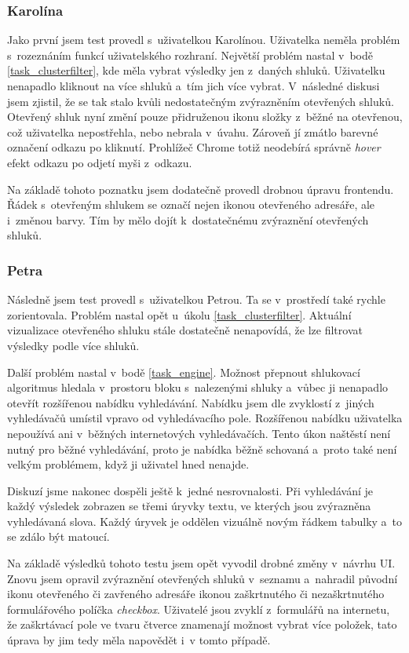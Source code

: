 \subsubsection{Karolína}
Jako první jsem test provedl s~uživatelkou Karolínou. Uživatelka neměla problém s~rozeznáním funkcí uživatelského rozhraní. Největší problém nastal v~bodě \ref{task_clusterfilter}, kde měla vybrat výsledky jen z~daných shluků. Uživatelku nenapadlo kliknout na více shluků a~tím jich více vybrat. V~následné diskusi jsem zjistil, že se tak stalo kvůli nedostatečným zvýrazněním otevřených shluků. Otevřený shluk nyní změní pouze přidruženou ikonu složky z~běžné na otevřenou, což uživatelka nepostřehla, nebo nebrala v~úvahu. Zároveň jí zmátlo barevné označení odkazu po kliknutí. Prohlížeč Chrome totiž neodebírá správně \emph{hover} efekt odkazu po odjetí myši z~odkazu.

Na základě tohoto poznatku jsem dodatečně provedl drobnou úpravu frontendu. Řádek s~otevřeným shlukem se označí nejen ikonou otevřeného adresáře, ale i~změnou barvy. Tím by mělo dojít k~dostatečnému zvýraznění otevřených shluků.

\subsubsection{Petra}
Následně jsem test provedl s~uživatelkou Petrou. Ta se v~prostředí také rychle zorientovala. Problém nastal opět u~úkolu \ref{task_clusterfilter}. Aktuální vizualizace otevřeného shluku stále dostatečně nenapovídá, že lze filtrovat výsledky podle více shluků.

Další problém nastal v~bodě \ref{task_engine}. Možnost přepnout shlukovací algoritmus hledala v~prostoru bloku s~nalezenými shluky a~vůbec ji nenapadlo otevřít rozšířenou nabídku vyhledávání. Nabídku jsem dle zvyklostí z~jiných vyhledávačů umístil vpravo od vyhledávacího pole. Rozšířenou nabídku uživatelka nepoužívá ani v~běžných internetových vyhledávačích. Tento úkon naštěstí není nutný pro běžné vyhledávání, proto je nabídka běžně schovaná a~proto také není velkým problémem, když ji uživatel hned nenajde. 

Diskuzí jsme nakonec dospěli ještě k~jedné nesrovnalosti. Při vyhledávání je každý výsledek zobrazen se třemi úryvky textu, ve kterých jsou zvýrazněna vyhledávaná slova. Každý úryvek je oddělen vizuálně novým řádkem tabulky a~to se zdálo být matoucí.

Na základě výsledků tohoto testu jsem opět vyvodil drobné změny v~návrhu UI. Znovu jsem opravil zvýraznění otevřených shluků v~seznamu a~nahradil původní ikonu otevřeného či zavřeného adresáře ikonou zaškrtnutého či nezaškrtnutého formulářového políčka \emph{checkbox}. Uživatelé jsou zvyklí z~formulářů na internetu, že zaškrtávací pole ve tvaru čtverce znamenají možnost vybrat více položek, tato úprava by jim tedy měla napovědět i~v tomto případě.

